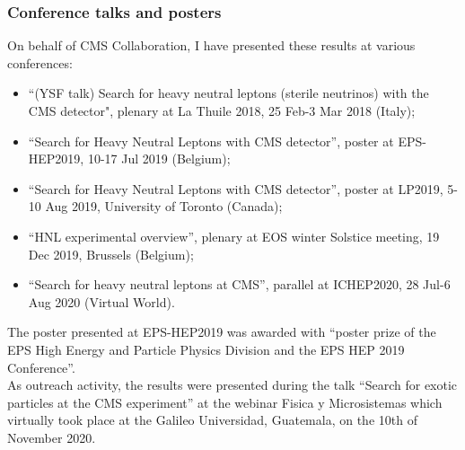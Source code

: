 \subsubsection*{Conference talks and posters}
On behalf of CMS Collaboration, I have presented these results at
various conferences:
\begin{itemize}
\item ``(YSF talk) Search for heavy neutral leptons (sterile
  neutrinos) with the CMS detector", plenary at La Thuile 2018, 25
  Feb-3 Mar 2018 (Italy);
\item ``Search for Heavy Neutral Leptons with CMS detector'', poster at
  EPS-HEP2019, 10-17 Jul 2019 (Belgium);
\item ``Search for Heavy Neutral Leptons with CMS detector'', poster at
  LP2019, 5-10 Aug 2019, University of Toronto (Canada);
\item ``HNL experimental overview'', plenary at EOS winter Solstice
  meeting, 19 Dec 2019, Brussels (Belgium);
\item 	``Search for heavy neutral leptons at CMS'', parallel at
  ICHEP2020, 28 Jul-6 Aug 2020 (Virtual World).
\end{itemize}
The poster presented at EPS-HEP2019 was awarded with ``poster prize of
the EPS High Energy and Particle Physics Division and the EPS HEP 2019
Conference''.\\
As outreach activity, the results were presented during the talk
``Search for exotic particles at the CMS experiment'' at the webinar
Fisica y Microsistemas which virtually took place at the Galileo Universidad,
Guatemala, on the 10th of November 2020.